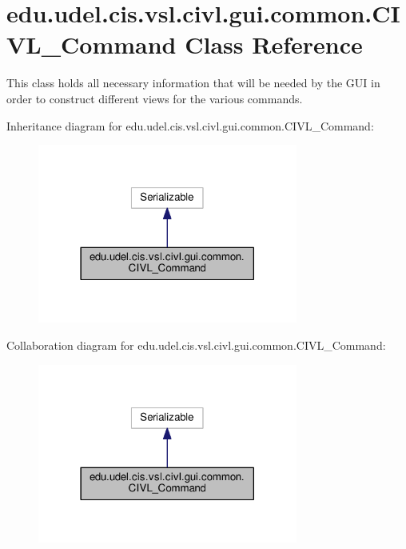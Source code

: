 \hypertarget{classedu_1_1udel_1_1cis_1_1vsl_1_1civl_1_1gui_1_1common_1_1CIVL__Command}{}\section{edu.\+udel.\+cis.\+vsl.\+civl.\+gui.\+common.\+C\+I\+V\+L\+\_\+\+Command Class Reference}
\label{classedu_1_1udel_1_1cis_1_1vsl_1_1civl_1_1gui_1_1common_1_1CIVL__Command}


This class holds all necessary information that will be needed by the G\+U\+I in order to construct different views for the various commands.  




Inheritance diagram for edu.\+udel.\+cis.\+vsl.\+civl.\+gui.\+common.\+C\+I\+V\+L\+\_\+\+Command\+:
\nopagebreak
\begin{figure}[H]
\begin{center}
\leavevmode
\includegraphics[width=242pt]{classedu_1_1udel_1_1cis_1_1vsl_1_1civl_1_1gui_1_1common_1_1CIVL__Command__inherit__graph}
\end{center}
\end{figure}


Collaboration diagram for edu.\+udel.\+cis.\+vsl.\+civl.\+gui.\+common.\+C\+I\+V\+L\+\_\+\+Command\+:
\nopagebreak
\begin{figure}[H]
\begin{center}
\leavevmode
\includegraphics[width=242pt]{classedu_1_1udel_1_1cis_1_1vsl_1_1civl_1_1gui_1_1common_1_1CIVL__Command__coll__graph}
\end{center}
\end{figure}
